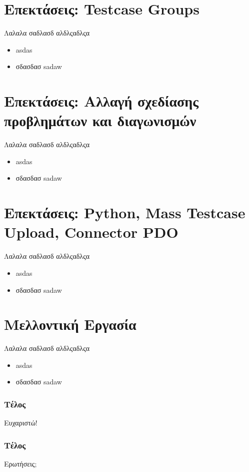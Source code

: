 \documentclass{beamer}
\begin{document}

\section{Επεκτάσεις: Testcase Groups}
\begin{frame}
  Λαλαλα σαδλασδ αλδλςαδλςα
  \begin{itemize}
      \item asdas
      \item σδασδασ sadaw
  \end{itemize}
\end{frame}

\section{Επεκτάσεις: Αλλαγή σχεδίασης προβλημάτων και διαγωνισμών}
\begin{frame}
  Λαλαλα σαδλασδ αλδλςαδλςα
  \begin{itemize}
      \item asdas
      \item σδασδασ sadaw
  \end{itemize}
\end{frame}

\section{Επεκτάσεις: Python, Mass Testcase Upload, Connector PDO}
\begin{frame}
  Λαλαλα σαδλασδ αλδλςαδλςα
  \begin{itemize}
      \item asdas
      \item σδασδασ sadaw
  \end{itemize}
\end{frame}


\section{Μελλοντική Εργασία}
\begin{frame}
  Λαλαλα σαδλασδ αλδλςαδλςα
  \begin{itemize}
      \item asdas
      \item σδασδασ sadaw
  \end{itemize}
\end{frame}

\begin{frame}
  \frametitle{Τέλος}
  \centering
  Ευχαριστώ!
\end{frame}

\begin{frame}
  \frametitle{Τέλος}
  \centering
  Ερωτήσεις;
\end{frame}
\end{document}
